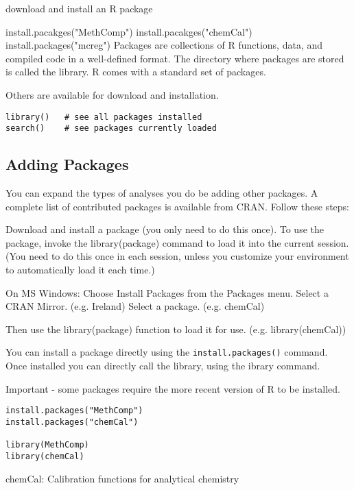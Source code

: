 download and install an R package

install.pacakges("MethComp")
install.pacakges("chemCal")
install.packages("mcreg")
Packages are collections of R functions, data, and compiled code in a well-defined format. The directory where packages are stored is called the library. R comes with a standard set of packages. 

Others are available for download and installation.

\begin{framed}
\begin{verbatim}
library()   # see all packages installed 
search()    # see packages currently loaded
\end{verbatim}
\end{framed}

\subsection{Adding Packages}
You can expand the types of analyses you do be adding other packages. A complete list of contributed packages is available from CRAN.
Follow these steps:

Download and install a package (you only need to do this once).
To use the package, invoke the library(package) command to load it into the current session. 
(You need to do this once in each session, unless you customize your environment to automatically load it each time.)

On MS Windows:
Choose Install Packages from the Packages menu.
Select a CRAN Mirror. (e.g. Ireland)
Select a package. (e.g. chemCal)

Then use the library(package) function to load it for use. (e.g. library(chemCal))

You can install a package directly using the \texttt{install.packages()} command. Once installed you can directly call the library, using the ibrary command. 

Important - some packages require the more recent version of R to be installed.

\begin{framed}
\begin{verbatim}
install.packages("MethComp")
install.packages("chemCal")

library(MethComp)
library(chemCal)
\end{verbatim}
\end{framed}

chemCal: Calibration functions for analytical chemistry

